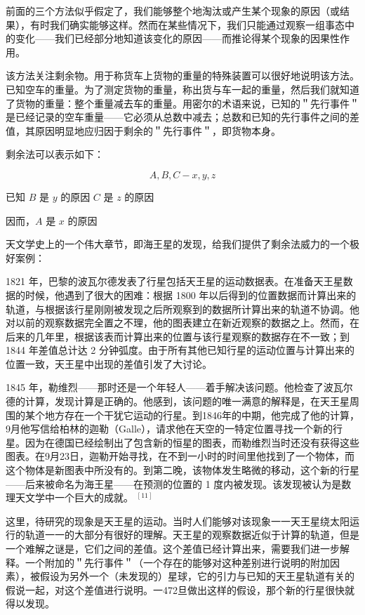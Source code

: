 前面的三个方法似乎假定了，我们能够整个地淘汰或产生某个现象的原因（或结果），有时我们确实能够这样。然而在某些情况下，我们只能通过观察一组事态中的变化——我们已经部分地知道该变化的原因——而推论得某个现象的因果性作用。

该方法关注剩余物。用于称货车上货物的重量的特殊装置可以很好地说明该方法。已知空车的重量。为了测定货物的重量，称出货与车一起的重量，然后我们就知道了货物的重量：整个重量减去车的重量。用密尔的术语来说，已知的＂先行事件＂是已经记录的空车重量——它必须从总数中减去；总数和已知的先行事件之间的差值，其原因明显地应归因于剩余的＂先行事件＂，即货物本身。

剩余法可以表示如下：

$$
A, B, C-x, y, z
$$

已知 $B$ 是 $y$ 的原因 $C$ 是 $z$ 的原因

因而，$A$ 是 $x$ 的原因

天文学史上的一个伟大章节，即海王星的发现，给我们提供了剩余法威力的一个极好案例：

1821 年，巴黎的波瓦尔德发表了行星包括天王星的运动数据表。在准备天王星数据的时候，他遇到了很大的困难：根据 1800 年以后得到的位置数据而计算出来的轨道，与根据该行星刚刚被发现之后所观察到的数据所计算出来的轨道不协调。他对以前的观察数据完全置之不理，他的图表建立在新近观察的数据之上。然而，在后来的几年里，根据该表而计算出来的位置与该行星观察的数据存在不一致；到 1844 年差值总计达 2 分钟弧度。由于所有其他已知行星的运动位置与计算出来的位置一致，天王星中出现的差值引发了大讨论。

1845 年，勒维烈——那时还是一个年轻人——着手解决该问题。他检查了波瓦尔德的计算，发现计算是正确的。他感到，该问题的唯一满意的解释是，在天王星周围的某个地方存在一个干犹它运动的行星。到1846年的中期，他完成了他的计算， 9月他写信给柏林的迦勒（Galle），请求他在天空的一特定位置寻找一个新的行星。因为在德国已经绘制出了包含新的恒星的图表，而勒维烈当时还没有获得这些图表。在9月23日，迦勒开始寻找，在不到一小时的时间里他找到了一个物体，而这个物体是新图表中所没有的。到第二晚，该物体发生略微的移动，这个新的行星——后来被命名为海王星——在预测的位置的 1 度内被发现。该发现被认为是数理天文学中一个巨大的成就。 ${ }^{[11]}$

这里，待研究的现象是天王星的运动。当时人们能够对该现象一一天王星绕太阳运行的轨道一一的大部分有很好的理解。天王星的观察数据近似于计算的轨道，但是一个难解之谜是，它们之间的差值。这个差值已经计算出来，需要我们进一步解释。一个附加的＂先行事件＂（一个存在的能够对这种差别进行说明的附加因素），被假设为另外一个（未发现的）星球，它的引力与已知的天王星轨道有关的假说一起，对这个差值进行说明。一472旦做出这样的假设，那个新的行星很快就得以发现。

